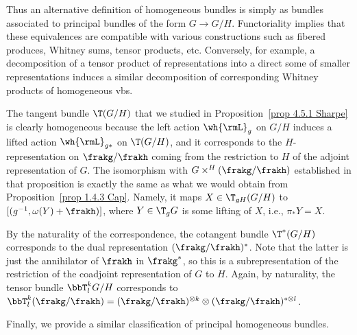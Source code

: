 Thus an alternative definition of homogeneous bundles is simply as bundles associated to principal bundles of the form $G\to G\slash H$. Functoriality implies that these equivalences are compatible with various constructions such as fibered produces, Whitney sums, tensor products, etc. Conversely, for example, a decomposition of a tensor product of representations into a direct some of smaller representations induces a similar decomposition of corresponding Whitney products of homogeneous \glspl{vb}.

\begin{example}\label{ex 1.4.3 Cap}
    The  tangent  bundle $\T(G\slash H)$ that we studied in Proposition~\ref{prop 4.5.1 Sharpe} is clearly homogeneous because the left action $\wh{\rmL}_g$ on $G\slash H$ induces a lifted action $\wh{\rmL}_{g\ast}$ on $\T(G\slash H)$, and it corresponds to the $H$-representation on $\frakg\slash \frakh$ coming from the restriction to $H$ of the adjoint representation of $G$. The isomorphism with $G\times^H (\frakg\slash\frakh)$ established in that proposition is exactly the same as what we would obtain from Proposition~\ref{prop 1.4.3 Cap}. Namely, it maps $X\in \T_{gH}(G\slash H)$ to $[(g^{-1},\omega(Y)+\frakh)]$, where $Y\in \T_g G$ is some lifting of $X$, i.e., $\pi_\ast Y=X$.

    By the naturality of the correspondence, the cotangent bundle $\T^\ast(G\slash H)$ corresponds to the dual representation $(\frakg\slash\frakh)^\ast$. Note that the latter is just the annihilator of $\frakh$ in $\frakg^\ast$, so this is a subrepresentation of the restriction of the coadjoint representation of $G$ to $H$. Again, by naturality, the tensor bundle $\bbT^k_l G\slash H$ corresponds to $\bbT^k_l(\frakg\slash\frakh)=(\frakg\slash\frakh)^{\otimes k}\otimes (\frakg\slash\frakh)^{\ast\otimes l}$.
\end{example}


Finally, we provide a similar classification of principal homogeneous bundles.

